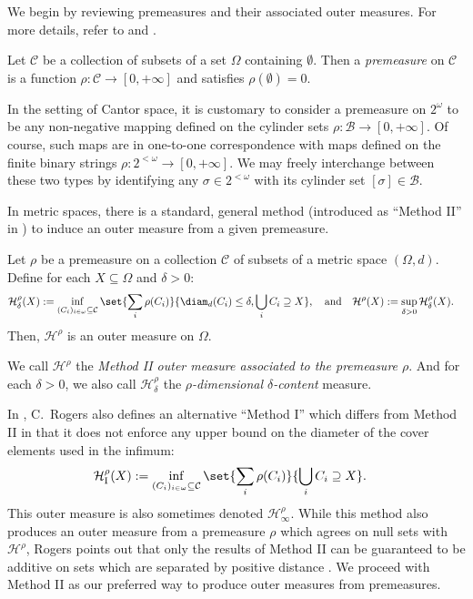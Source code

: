 We begin by reviewing premeasures and their associated outer measures. For more details, refer to \cite{Rei08} and \cite{Rog70}.

\begin{definition}
    Let $\mathcal{C}$ be a collection of subsets of a set $\Omega$ containing $\emptyset$. Then a \textit{premeasure} on $\mathcal{C}$ is a function $\rho : \mathcal{C} \to [0, +\infty]$ and satisfies $\rho(\emptyset) = 0$.
\end{definition}

In the setting of Cantor space, it is customary to consider a premeasure on $2^\omega$ to be any non-negative mapping defined on the cylinder sets $\rho : \mathcal{B} \to [0, +\infty]$. Of course, such maps are in one-to-one correspondence with maps defined on the finite binary strings $\rho: 2^{<\omega} \to [0, +\infty]$. We may freely interchange between these two types by identifying any $\sigma \in 2^{<\omega}$ with its cylinder set $[\sigma] \in \mathcal{B}$.

In metric spaces, there is a standard, general method (introduced as ``Method II'' in \cite{Rog70}) to induce an outer measure from a given premeasure. 

\begin{theorem}
    Let $\rho$ be a premeasure on a collection $\mathcal{C}$ of subsets of a metric space $(\Omega, d)$. Define for each $X \subseteq \Omega$ and $\delta > 0$:
    \begin{align*}
        \mathcal{H}^\rho_\delta(X) &:= \inf_{(C_i)_{i \in \omega} \subseteq \mathcal{C}} \set{\sum_{i} \rho(C_i)}{\diam_d(C_i) \leq \delta, \bigcup_i C_i \supseteq X}, \quad \text{and} \quad \mathcal{H}^\rho(X) := \sup_{\delta > 0} \mathcal{H}^\rho_\delta(X).
    \end{align*}
    Then, $\mathcal{H}^\rho$ is an outer measure on $\Omega$.
\end{theorem}

We call $\mathcal{H}^\rho$ the \textit{Method II outer measure associated to the premeasure $\rho$}. And for each $\delta > 0$, we also call $\mathcal{H}^\rho_\delta$ the \textit{$\rho$-dimensional $\delta$-content} measure.

In \cite{Rog70}, C.~Rogers also defines an alternative ``Method I'' which differs from Method II in that it does not enforce any upper bound on the diameter of the cover elements used in the infimum:
\begin{align*}
    \mathcal{H}^\rho_{\operatorname{I}}(X) &:= \inf_{(C_i)_{i \in \omega} \subseteq \mathcal{C}} \set{\sum_{i} \rho(C_i)}{\bigcup_i C_i \supseteq X}.
\end{align*}
This outer measure is also sometimes denoted $\mathcal{H}^\rho_\infty$. While this method also produces an outer measure from a premeasure $\rho$ which agrees on null sets with $\mathcal{H}^\rho$, Rogers points out that only the results of Method II can be guaranteed to be additive on sets which are separated by positive distance \cite{Rog70}. We proceed with Method II as our preferred way to produce outer measures from premeasures.

